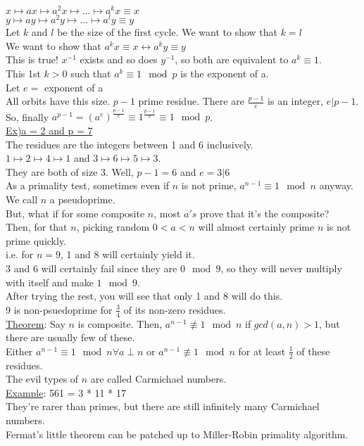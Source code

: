 \documentclass[13pt]{article}
\begin{document}
		$x \mapsto ax \mapsto a^2x \mapsto \ldots \mapsto a^kx \equiv x$\\
		$y \mapsto ay \mapsto a^2y \mapsto \ldots \mapsto a^ly \equiv y$\\
		Let $k$ and $l$ be the size of the first cycle. We want to show that 
		$k = l$\\
		We want to show that $a^kx \equiv x \leftrightarrow a^ky \equiv y$\\
		This is true! $x^{-1}$ exists and so does $y^{-1}$, so both are 
		equivalent to $a^k \equiv 1$.\\
		This 1st $k > 0$ such that $a^k \equiv 1 \mod p$ is the exponent of a.\\
		Let $e = $ exponent of a\\
		All orbits have this size. $p-1$ prime residue. There are $\frac{p-1}{e}$
		is an integer, $e | p - 1$.\\
		So, finally $a^{p-1} = (a^e)^{\frac{p-1}{e}} \equiv 1^{\frac{p-1}{e}}
		\equiv 1 \mod p$.\\
		\underline{Ex)a = 2 and p = 7}\\
		The residues are the integers between 1 and 6 inclusively.\\
		$1 \mapsto 2 \mapsto 4 \mapsto 1$ and $3 \mapsto 6 \mapsto 5 \mapsto 3$.\\
		They are both of size 3. Well, $p-1 = 6$ and $e = 3 | 6$\\
		As a primality test, sometimes even if $n$ is not prime, $a^{n-1} \equiv
		1 \mod n$ anyway. We call $n$ a pseudoprime.\\
		But, what if for some composite $n$, most $a's$ prove that it's the
		composite?\\
		Then, for that $n$, picking random $0 < a < n$ will almost certainly
		prime $n$ is not prime quickly.\\
		i.e. for $n = 9$, 1 and 8 will certainly yield it.\\
		3 and 6 will certainly fail since they are $0 \mod 9$, so they will
		never multiply with itself and make $1 \mod 9$.\\
		After trying the rest, you will see that only 1 and 8 will do this.\\
		9 is non-psuedoprime for $\frac{3}{4}$ of its non-zero residues.\\
		\underline{Theorem}: Say $n$ is composite. Then, $a^{n-1} \not\equiv
		1 \mod n$ if $gcd(a,n) > 1$, but there are usually few of these.\\
		Either $a^{n-1} \equiv 1 \mod n \forall a \perp n$ or $a^{n-1}
		\not\equiv 1 \mod n$ for at least $\frac{1}{2}$ of these residues.\\
		The evil types of $n$ are called Carmichael numbers.\\
		\underline{Example}: 561 = 3 * 11 * 17\\
		They're rarer than primes, but there are still infinitely many Carmichael
		numbers. \\
		Fermat's little theorem can be patched up to Miller-Robin primality
		algorithm.
\end{document}
